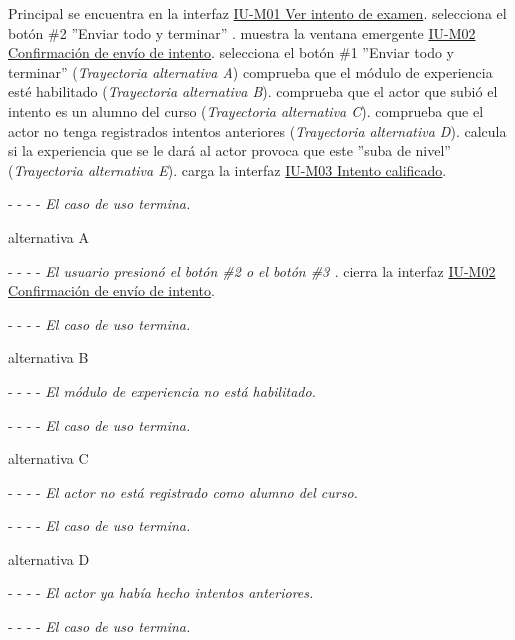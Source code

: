 
\begin{UCtrayectoria}{Principal}
    \actor se encuentra en la interfaz \hyperref[IUM01]{IU-M01 Ver intento de examen}.
    \actor selecciona el botón \#2 ''Enviar todo y terminar'' .
    \sistema muestra la ventana emergente \hyperref[IUM02]{IU-M02 Confirmación de envío de intento}.
    \actor selecciona el botón \#1 ''Enviar todo y terminar'' ({\it Trayectoria alternativa A})
    \sistema comprueba que el módulo de experiencia esté habilitado ({\it Trayectoria alternativa B}).
    \sistema comprueba que el actor que subió el intento es un alumno del curso ({\it Trayectoria alternativa C}).
    \sistema comprueba que el actor no tenga registrados intentos anteriores ({\it Trayectoria alternativa D}).
    \sistema calcula si la experiencia que se le dará al actor provoca que este ''suba de nivel'' ({\it Trayectoria alternativa E}).
    \sistema carga la interfaz \hyperref[IUM03]{IU-M03 Intento calificado}.
    \item[- -] - - {\em El caso de uso termina.}
\end{UCtrayectoria}

\begin{UCtrayectoria}{alternativa A}
    \item[- -] - - {\em El usuario presionó el botón \#2  o  el botón \#3 .}
    \sistema cierra la interfaz \hyperref[IUM02]{IU-M02 Confirmación de envío de intento}.
    \item[- -] - - {\em El caso de uso termina.}
\end{UCtrayectoria}

\begin{UCtrayectoria}{alternativa B}
    \item[- -] - - {\em El módulo de experiencia no está habilitado.}
    \item[- -] - - {\em El caso de uso termina.}
\end{UCtrayectoria}

\begin{UCtrayectoria}{alternativa C}
    \item[- -] - - {\em El actor no está registrado como alumno del curso.}
    \item[- -] - - {\em El caso de uso termina.}
\end{UCtrayectoria}

\begin{UCtrayectoria}{alternativa D}
    \item[- -] - - {\em El actor ya había hecho intentos anteriores.}
    \item[- -] - - {\em El caso de uso termina.}
\end{UCtrayectoria}

